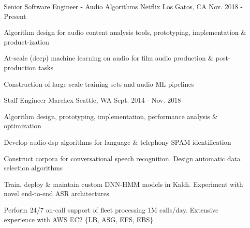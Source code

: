 

\begin{cventries}

  \cventry
    {Senior Software Engineer - Audio Algorithms} %
    {Netflix} %
    {Los Gatos, CA} %
    {Nov. 2018 - Present} %
    {
      \begin{cvitems} %
        \item {Algorithm design for audio content analysis tools, prototyping, implementation \& product-ization}
        \item {At-scale (deep) machine learning on audio for film audio production \& post-production tasks}
        \item {Construction of large-scale training sets and audio ML pipelines}
      \end{cvitems}
    }


  \cventry
    {Staff Engineer} %
    {Marchex} %
    {Seattle, WA} %
    {Sept. 2014 - Nov. 2018} %
    {
      \begin{cvitems} %
        \item {Algorithm design, prototyping, implementation, performance analysis \& optimization}
        \item {Develop audio-dsp algorithms for language \& telephony SPAM identification}
        \item {Construct corpora for conversational speech recognition. Design automatic data selection algorithms}
        \item {Train, deploy \& maintain custom DNN-HMM models in Kaldi. Experiment with novel end-to-end ASR architectures}
        \item {Perform 24/7 on-call support of fleet processing 1M calls/day. Extensive experience with AWS EC2 \{LB, ASG, EFS, EBS\}}
      \end{cvitems}
    }


\end{cventries}

